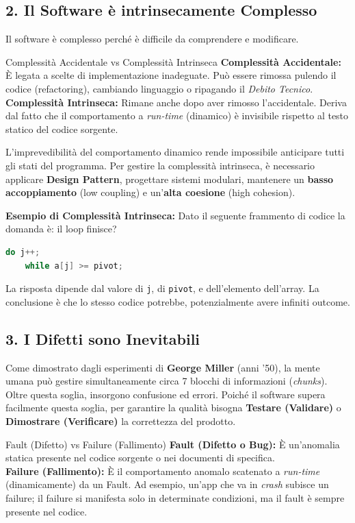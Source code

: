 \documentclass[12pt,a4paper,oneside]{book}
\begin{document}
\subsection{2. Il Software è intrinsecamente Complesso}
Il software è complesso perché è difficile da comprendere e modificare.
\begin{definition}{Complessità Accidentale vs Complessità Intrinseca}{}
\textbf{Complessità Accidentale:} È legata a scelte di implementazione inadeguate. Può essere rimossa pulendo il codice (refactoring), cambiando linguaggio o ripagando il \textit{Debito Tecnico}.\\
\textbf{Complessità Intrinseca:} Rimane anche dopo aver rimosso l'accidentale. Deriva dal fatto che il comportamento a \textit{run-time} (dinamico) è invisibile rispetto al testo statico del codice sorgente.
\end{definition}

L'imprevedibilità del comportamento dinamico rende impossibile anticipare tutti gli stati del programma. Per gestire la complessità intrinseca, è necessario applicare \textbf{Design Pattern}, progettare sistemi modulari, mantenere un \textbf{basso accoppiamento} (low coupling) e un'\textbf{alta coesione} (high cohesion).

\textbf{Esempio di Complessità Intrinseca:}
Dato il seguente frammento di codice la domanda è: il loop finisce?

\begin{lstlisting}[language=Java]
do j++;
    while a[j] >= pivot;
\end{lstlisting}
La risposta dipende dal valore di \texttt{j}, di \texttt{pivot}, e dell'elemento dell'array. La conclusione è che lo stesso codice potrebbe, potenzialmente avere infiniti outcome.

\subsection{3. I Difetti sono Inevitabili}
Come dimostrato dagli esperimenti di \textbf{George Miller} (anni '50), la mente umana può gestire simultaneamente circa 7 blocchi di informazioni (\textit{chunks}). Oltre questa soglia, insorgono confusione ed errori. Poiché il software supera facilmente questa soglia, per garantire la qualità bisogna \textbf{Testare (Validare)} o \textbf{Dimostrare (Verificare)} la correttezza del prodotto.

\begin{definition}{Fault (Difetto) vs Failure (Fallimento)}{}
\textbf{Fault (Difetto o Bug):} È un'anomalia statica presente nel codice sorgente o nei documenti di specifica.\\
\textbf{Failure (Fallimento):} È il comportamento anomalo scatenato a \textit{run-time} (dinamicamente) da un Fault. Ad esempio, un'app che va in \textit{crash} subisce un failure; il failure si manifesta solo in determinate condizioni, ma il fault è sempre presente nel codice.
\end{definition}
\end{document}
